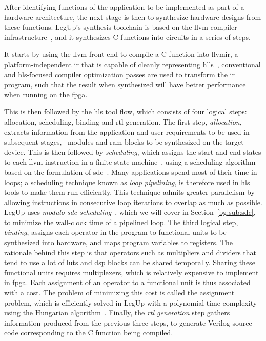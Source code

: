 After identifying functions of the application to be implemented as part of a
hardware architecture, the next stage is then to synthesize hardware designs
from these functions.  LegUp's synthesis toolchain is based on the \gls{llvm}
compiler infrastructure~\cite{llvm}, and it synthesizes C functions into
circuits in a series of steps.

It starts by using the \gls{llvm} front-end to compile a C function into
\gls{llvmir}, a platform-independent \gls{ir} that is capable of cleanly
representing \glspl{hll}~\cite{llvm_ir}, conventional and \gls{hls}-focused
compiler optimization passes are used to transform the \gls{ir} program, such
that the result when synthesized will have better performance when running on
the \gls{fpga}\@.

This is then followed by the \gls{hls} tool flow, which consists of four
logical steps: allocation, scheduling, binding and \gls{rtl} generation.  The
first step, \emph{allocation}, extracts information from the application and
user requirements to be used in subsequent stages, \eg~modules and \gls{ram}
blocks to be synthesized on the target device.  This is then followed by
\emph{scheduling}, which assigns the start and end states to each \gls{llvm}
instruction in a finite state machine~\cite{legup}, using a scheduling
algorithm based on the formulation of \gls{sdc}~\cite{legup, canis13, cong06}.
Many applications spend most of their time in loops; a scheduling technique
known as \emph{loop pipelining}, is therefore used in \gls{hls} tools to
make them run efficiently.  This technique admits greater parallelism by
allowing instructions in consecutive loop iterations to overlap as much as
possible.  LegUp uses \emph{modulo \gls{sdc} scheduling}~\cite{canis14}, which
we will cover in Section~\ref{bg:sub:sdc}, to minimize the wall-clock time
of a pipelined loop.  The third logical step, \emph{binding}, assigns each
operator in the program to functional units to be synthesized into hardware,
and maps program variables to registers.  The rationale behind this step is
that operators such as multipliers and dividers that tend to use a lot of
\glspl{lut} and \gls{dsp} blocks can be shared temporally.  Sharing these
functional units requires multiplexers, which is relatively expensive to
implement in \gls{fpga}\@.  Each assignment of an operator to a functional unit
is thus associated with a cost.  The problem of minimizing this cost is called
the assignment problem, which is efficiently solved in LegUp with a polynomial
time complexity using the Hungarian algorithm~\cite{canis13, kuhn10}.  Finally,
the \emph{\gls{rtl} generation} step gathers information produced from the
previous three steps, to generate Verilog source code corresponding to the C
function being compiled.

